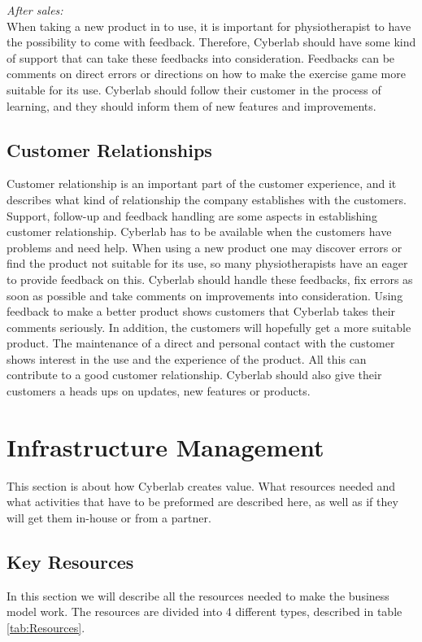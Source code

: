 \emph{After sales:}\\
When taking a new product in to use, it is important for physiotherapist to have the possibility to come with feedback. Therefore, Cyberlab should have some kind of support that can take these feedbacks into consideration. Feedbacks can be comments on direct errors or directions on how to make the exercise game more suitable for its use. Cyberlab should follow their customer in the process of learning, and they should inform them of new features and improvements.  
\subsection{Customer Relationships}
Customer relationship is an important part of the customer experience, and it describes what kind of relationship the company establishes with the customers. Support, follow-up and feedback handling are some aspects in establishing customer relationship. Cyberlab has to be available when the customers have problems and need help. When using a new product one may discover errors or find the product not suitable for its use, so many physiotherapists have an eager to provide feedback on this. Cyberlab should handle these feedbacks, fix errors as soon as possible and take comments on improvements into consideration. Using feedback to make a better product shows customers that Cyberlab takes their comments seriously.  In addition, the customers will hopefully get a more suitable product. The maintenance of a direct and personal contact with the customer shows interest in the use and the experience of the product. All this can contribute to a good customer relationship. Cyberlab should also give their customers a heads ups on updates, new features or products.
\section{Infrastructure Management}
This section is about how Cyberlab creates value. What resources needed and what activities that have to be preformed are described here, as well as if they will get them in-house or from a partner. 

\subsection{Key Resources}

In this section we will describe all the resources needed to make the business model work. The resources are divided into 4 different types, described in table \ref{tab:Resources}.
\newpage


